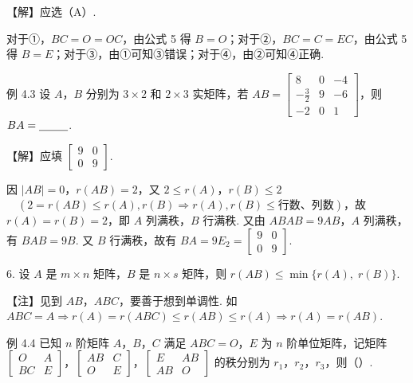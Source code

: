 【解】应选（A）.

对于①，$BC=O=OC$，由公式 5 得 $B=O$；对于②，$BC=C=EC$，由公式 5 得 $B=E$；对于③，由①可知③错误；对于④，由②可知④正确.

\begin{fcard}{例 4.3}
设 $A$，$B$ 分别为 $3\times 2$ 和 $2\times 3$ 实矩阵，若 $AB=\begin{bmatrix}8&0&-4\\-\frac32&9&-6\\-2&0&1\end{bmatrix}$，则 $BA=\underline{\hspace{2.6em}}$.
\end{fcard}

【解】应填 $\begin{bmatrix}9&0\\0&9\end{bmatrix}$.

因 $|AB|=0$，$r(AB)=2$，又 $2\le r(A)$，$r(B)\le 2$ $\quad(2=r(AB)\le r(A),r(B)\Rightarrow r(A),r(B)\le\text{行数、列数})$，故 $r(A)=r(B)=2$，即 $A$ 列满秩，$B$ 行满秩. 又由 $ABAB=9AB$，$A$ 列满秩，有 $BAB=9B$. 又 $B$ 行满秩，故有 $BA=9E_2=\begin{bmatrix}9&0\\0&9\end{bmatrix}$.

6. 设 $A$ 是 $m\times n$ 矩阵，$B$ 是 $n\times s$ 矩阵，则 $r(AB)\le\min\{r(A),\;r(B)\}$.

\begin{fnote}
【注】见到 $AB$，$ABC$，要善于想到单调性.
如 $ABC=A\Rightarrow r(A)=r(ABC)\le r(AB)\le r(A)\Rightarrow r(A)=r(AB)$.
\end{fnote}

\begin{fcard}{例 4.4}
已知 $n$ 阶矩阵 $A$，$B$，$C$ 满足 $ABC=O$，$E$ 为 $n$ 阶单位矩阵，记矩阵 $\begin{bmatrix}O&A\\BC&E\end{bmatrix}$，$\begin{bmatrix}AB&C\\O&E\end{bmatrix}$，$\begin{bmatrix}E&AB\\AB&O\end{bmatrix}$ 的秩分别为 $r_1$，$r_2$，$r_3$，则（\quad）.
\end{fcard}


